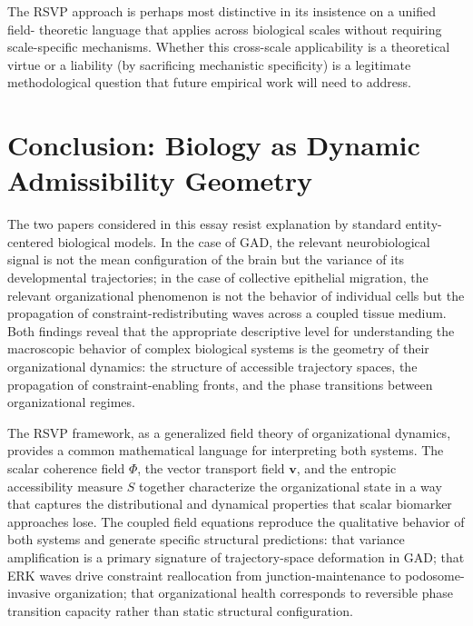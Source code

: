 \documentclass[11pt,a4paper]{article}
\theoremstyle{plain}
\theoremstyle{definition}
\begin{document}
The RSVP approach is perhaps most distinctive in its insistence on a unified field-
theoretic language that applies across biological scales without requiring scale-specific
mechanisms. Whether this cross-scale applicability is a theoretical virtue or a liability
(by sacrificing mechanistic specificity) is a legitimate methodological question that
future empirical work will need to address.

\section{Conclusion: Biology as Dynamic Admissibility Geometry}
\label{sec:conclusion}

The two papers considered in this essay resist explanation by standard entity-centered
biological models. In the case of GAD, the relevant neurobiological signal is not the
mean configuration of the brain but the variance of its developmental trajectories;
in the case of collective epithelial migration, the relevant organizational phenomenon
is not the behavior of individual cells but the propagation of constraint-redistributing
waves across a coupled tissue medium. Both findings reveal that the appropriate
descriptive level for understanding the macroscopic behavior of complex biological
systems is the geometry of their organizational dynamics: the structure of accessible
trajectory spaces, the propagation of constraint-enabling fronts, and the phase
transitions between organizational regimes.

The RSVP framework, as a generalized field theory of organizational dynamics, provides
a common mathematical language for interpreting both systems. The scalar coherence
field $\Phi$, the vector transport field $\mathbf{v}$, and the entropic accessibility
measure $S$ together characterize the organizational state in a way that captures
the distributional and dynamical properties that scalar biomarker approaches lose.
The coupled field equations reproduce the qualitative behavior of both systems and
generate specific structural predictions: that variance amplification is a primary
signature of trajectory-space deformation in GAD; that ERK waves drive constraint
reallocation from junction-maintenance to podosome-invasive organization; that
organizational health corresponds to reversible phase transition capacity rather
than static structural configuration.
\end{document}
